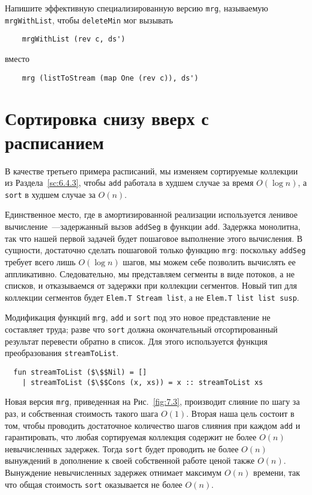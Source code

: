 \begin{exercise}\label{ex:7.4}
  Напишите эффективную специализированную версию \lstinline!mrg!,
  называемую \lstinline!mrgWithList!, чтобы \lstinline!deleteMin! мог
  вызывать 
  \begin{lstlisting}
    mrgWithList (rev c, ds')
  \end{lstlisting}
  вместо
  \begin{lstlisting}
    mrg (listToStream (map One (rev c)), ds')
  \end{lstlisting}
\end{exercise}

\section{Сортировка снизу вверх с расписанием}

В качестве третьего примера расписаний, мы изменяем сортируемые
коллекции из Раздела~\ref{sc:6.4.3}, чтобы \lstinline!add! работала в
худшем случае за время $O(\log n)$, а \lstinline!sort! в худшем случае за $O(n)$.

Единственное место, где в амортизированной реализации используется
ленивое вычисление~---задержанный вызов \lstinline!addSeg! в функции
\lstinline!add!. Задержка монолитна, так что нашей первой задачей
будет пошаговое выполнение этого вычисления. В сущности, достаточно
сделать пошаговой только функцию \lstinline!mrg!: поскольку
\lstinline!addSeg! требует всего лишь $O(\log n)$ шагов, мы можем себе
позволить вычислять ее аппликативно.  Следовательно, мы представляем
сегменты в виде потоков, а не списков, и отказываемся от задержки при
коллекции сегментов. Новый тип для коллекции сегментов будет
\lstinline!Elem.T Stream list!, а не \lstinline!Elem.T list list susp!.

Модификация функций \lstinline!mrg!, \lstinline!add! и
\lstinline!sort! под это новое представление не составляет труда;
разве что \lstinline!sort! должна окончательный отсортированный
результат перевести обратно в список. Для этого используется функция
преобразования \lstinline!streamToList!.
\begin{lstlisting}
  fun streamToList ($\$$Nil) = []
    | streamToList ($\$$Cons (x, xs)) = x :: streamToList xs
\end{lstlisting}

Новая версия \lstinline!mrg!, приведенная на Рис.~\ref{fig:7.3},
производит слияние по шагу за раз, и собственная стоимость такого шага
$O(1)$. Вторая наша цель состоит в том, чтобы проводить достаточное
количество шагов слияния при каждом \lstinline!add! и
гарантировать, что любая сортируемая коллекция содержит не более
$O(n)$ невычисленных задержек. Тогда \lstinline!sort! будет проводить
не более $O(n)$ вынуждений в дополнение к своей собственной работе
ценой также $O(n)$. Вынуждение невычисленных задержек отнимает
максимум $O(n)$ времени, так что общая стоимость \lstinline!sort!
оказывается не более $O(n)$.

